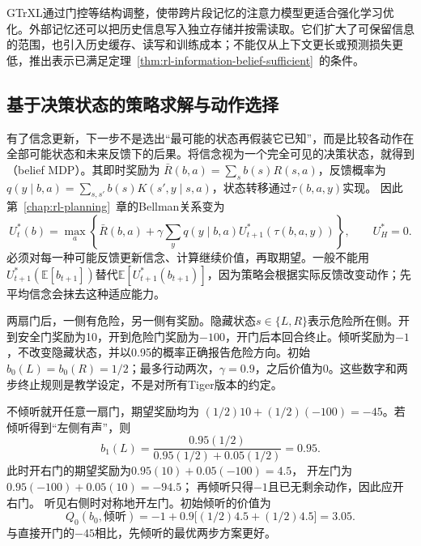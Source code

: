 GTrXL通过门控等结构调整，使带跨片段记忆的注意力模型更适合强化学习优化。外部记忆还可以把历史信息写入独立存储并按需读取。它们扩大了可保留信息的范围，也引入历史缓存、读写和训练成本；不能仅从上下文更长或预测损失更低，推出表示已满足定理~\ref{thm:rl-information-belief-sufficient}~的条件。

\subsection{基于决策状态的策略求解与动作选择}
\label{sec:rl-information-belief-control}

有了信念更新，下一步不是选出“最可能的状态再假装它已知”，而是比较各动作在全部可能状态和未来反馈下的后果。将信念视为一个完全可见的决策状态，就得到（belief MDP）。其即时奖励为
$\bar R(b,a)=\sum_s b(s)R(s,a)$，反馈概率为
$q(y\mid b,a)=\sum_{s,s'}b(s)K(s',y\mid s,a)$，状态转移通过$\tau(b,a,y)$实现。
因此第~\ref{chap:rl-planning}~章的Bellman关系变为
\begin{equation}
  \label{eq:rl-information-belief-bellman}
  U_t^*(b)=\max_a\left\{
    \bar R(b,a)+\gamma\sum_yq(y\mid b,a)
                    U_{t+1}^*(\tau(b,a,y))\right\},
  \qquad U_H^*=0.
\end{equation}
必须对每一种可能反馈更新信念、计算继续价值，再取期望。一般不能用
$U_{t+1}^*(\mathbb E[b_{t+1}])$替代$\mathbb E[U_{t+1}^*(b_{t+1})]$，因为策略会根据实际反馈改变动作；先平均信念会抹去这种适应能力。

\begin{example}
  \label{ex:rl-information-tiger}
  两扇门后，一侧有危险，另一侧有奖励。隐藏状态$s\in\{L,R\}$表示危险所在侧。开到安全门奖励为10，开到危险门奖励为$-100$，开门后本回合终止。倾听奖励为$-1$，不改变隐藏状态，并以0.95的概率正确报告危险方向。初始$b_0(L)=b_0(R)=1/2$；最多行动两次，$\gamma=0.9$，之后价值为0。这些数字和两步终止规则是教学设定，不是对所有Tiger版本的约定。

  不倾听就开任意一扇门，期望奖励均为
  $(1/2)10+(1/2)(-100)=-45$。若倾听得到“左侧有声”，则
  \[
    b_1(L)=\frac{0.95(1/2)}
                        {0.95(1/2)+0.05(1/2)}=0.95.
  \]
  此时开右门的期望奖励为$0.95(10)+0.05(-100)=4.5$，
  开左门为$0.95(-100)+0.05(10)=-94.5$；
  再倾听只得$-1$且已无剩余动作，因此应开右门。
  听见右侧时对称地开左门。初始倾听的价值为
  \[
    Q_0(b_0,\text{倾听})
       =-1+0.9\bigl[(1/2)4.5+(1/2)4.5\bigr]=3.05.
  \]
  与直接开门的$-45$相比，先倾听的最优两步方案更好。
\end{example}

